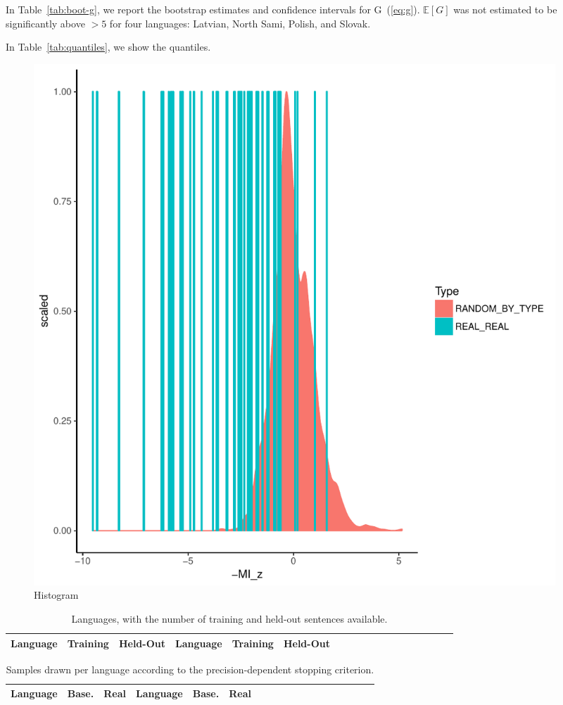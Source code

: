 \documentclass[11pt,letterpaper]{article}
\newcommand{\E}[0]{\mathbb{E}}
\begin{document}
In Table~\ref{tab:boot-g}, we report the bootstrap estimates and confidence intervals for G~(\ref{eq:g}).
$\E[G]$ was not estimated to be significantly above $>5$ for four languages: Latvian, North Sami, Polish, and Slovak.


In Table~\ref{tab:quantiles}, we show the quantiles.



\begin{figure}
\includegraphics[width=0.95\textwidth]{neural/figures/full-REAL-listener-surprisal-memory-HIST_z_byMem_onlyWordForms_boundedVocab.pdf}
\caption{Histogram}\label{fig:hist-real}
\end{figure}


\begin{table}
\begin{longtable}{l|ll||l|llllllllllllll}
	Language & Training & Held-Out & 	Language & Training & Held-Out\\ \hline

\end{longtable}
	\caption{Languages, with the number of training and held-out sentences available.}\label{tab:corpora}
\end{table}

\begin{table}
\begin{longtable}{l|ll||l|llllllllllllll}
	Language & Base. & Real & Language & Base. & Real \\ \hline

\end{longtable}
	\caption{Samples drawn per language according to the precision-dependent stopping criterion.}\label{tab:samples}
\end{table}
\end{document}
